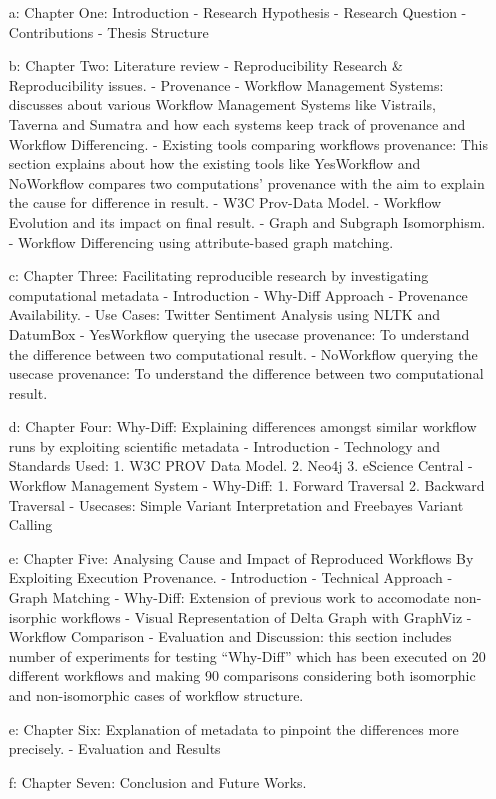 \documentclass[10pt,conference,twocolumn]{IEEEtran}
\begin{document}
\begin{itemize}
\item[a:] Chapter One: Introduction
- Research Hypothesis
- Research Question
- Contributions
- Thesis Structure
\item[b:] Chapter Two: Literature review
- Reproducibility Research \& Reproducibility issues.
- Provenance
- Workflow Management Systems: discusses about various Workflow Management Systems like Vistrails, Taverna and Sumatra and how each systems keep track of provenance and Workflow Differencing.
- Existing tools comparing workflows provenance: This section explains about how the existing tools like YesWorkflow and NoWorkflow compares two computations' provenance with the aim to explain the cause for difference in result.
- W3C Prov-Data Model.
- Workflow Evolution and its impact on final result.
- Graph and Subgraph Isomorphism.
- Workflow Differencing using attribute-based graph matching.
\item[c:] Chapter Three: Facilitating reproducible research by investigating computational metadata
- Introduction
- Why-Diff Approach
- Provenance Availability.
- Use Cases: Twitter Sentiment Analysis using NLTK and DatumBox
- YesWorkflow querying the usecase provenance: To understand the difference between two computational result.
- NoWorkflow querying the usecase provenance: To understand the difference between two computational result.
\item[d:] Chapter Four: Why-Diff: Explaining differences amongst similar workflow runs by exploiting scientific metadata
- Introduction
- Technology and Standards Used: 
	1. W3C PROV Data Model. 
	2. Neo4j
	3. eScience Central - Workflow Management System
- Why-Diff: 
	1. Forward Traversal
	2. Backward Traversal
- Usecases: Simple Variant Interpretation and Freebayes Variant Calling
\item[e:] Chapter Five: Analysing Cause and Impact of Reproduced
Workflows By Exploiting Execution Provenance.
- Introduction
- Technical Approach
- Graph Matching
- Why-Diff: Extension of previous work to accomodate non-isorphic workflows
- Visual Representation of Delta Graph with GraphViz
- Workflow Comparison
- Evaluation and Discussion: this section includes
number of experiments for testing \enquote{Why-Diff}
which has been executed on 20 different workflows and making 90 comparisons considering both isomorphic and non-isomorphic cases of workflow structure.
\item[e:] Chapter Six: Explanation of metadata to pinpoint the differences more precisely.
- Evaluation and Results
\item[f:] Chapter Seven: Conclusion and Future Works.
\end{itemize}
\end{document}
